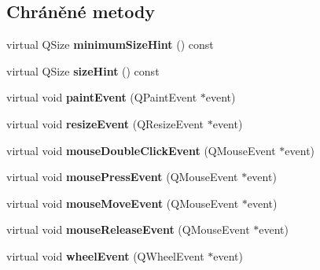 \subsection*{Chráněné metody}
\begin{DoxyCompactItemize}
\item 
\hypertarget{classQCustomPlot_a4904f06d831afae29cd5d10e889388c3}{}virtual Q\+Size {\bfseries minimum\+Size\+Hint} () const \label{classQCustomPlot_a4904f06d831afae29cd5d10e889388c3}

\item 
\hypertarget{classQCustomPlot_a21d84d299c3651ec36d11a7826274a3c}{}virtual Q\+Size {\bfseries size\+Hint} () const \label{classQCustomPlot_a21d84d299c3651ec36d11a7826274a3c}

\item 
\hypertarget{classQCustomPlot_a2bbc3b1c24bfcc8a7cc1f3008cdd9b73}{}virtual void {\bfseries paint\+Event} (Q\+Paint\+Event $\ast$event)\label{classQCustomPlot_a2bbc3b1c24bfcc8a7cc1f3008cdd9b73}

\item 
\hypertarget{classQCustomPlot_a13e05523a40c3f08875df5cde85cf0d9}{}virtual void {\bfseries resize\+Event} (Q\+Resize\+Event $\ast$event)\label{classQCustomPlot_a13e05523a40c3f08875df5cde85cf0d9}

\item 
\hypertarget{classQCustomPlot_a77591913a5b543bdc465dd5e08325a49}{}virtual void {\bfseries mouse\+Double\+Click\+Event} (Q\+Mouse\+Event $\ast$event)\label{classQCustomPlot_a77591913a5b543bdc465dd5e08325a49}

\item 
\hypertarget{classQCustomPlot_abce84fa2c71e47b9295d67e8fce84bb4}{}virtual void {\bfseries mouse\+Press\+Event} (Q\+Mouse\+Event $\ast$event)\label{classQCustomPlot_abce84fa2c71e47b9295d67e8fce84bb4}

\item 
\hypertarget{classQCustomPlot_ac64727a4f442770f6e5e6be2d0530843}{}virtual void {\bfseries mouse\+Move\+Event} (Q\+Mouse\+Event $\ast$event)\label{classQCustomPlot_ac64727a4f442770f6e5e6be2d0530843}

\item 
\hypertarget{classQCustomPlot_a724e97d2e8c03e68adac5f4b6164a1b3}{}virtual void {\bfseries mouse\+Release\+Event} (Q\+Mouse\+Event $\ast$event)\label{classQCustomPlot_a724e97d2e8c03e68adac5f4b6164a1b3}

\item 
\hypertarget{classQCustomPlot_a7b8bd7e8d3a1d23a8595e9c6a6b76ef1}{}virtual void {\bfseries wheel\+Event} (Q\+Wheel\+Event $\ast$event)\label{classQCustomPlot_a7b8bd7e8d3a1d23a8595e9c6a6b76ef1}


\end{DoxyCompactItemize}
